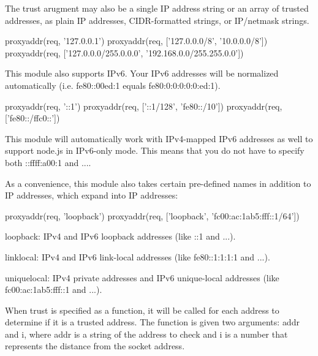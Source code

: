 The {\ttfamily trust} arugment may also be a single I\+P address string or an array of trusted addresses, as plain I\+P addresses, C\+I\+D\+R-\/formatted strings, or I\+P/netmask strings.


\begin{DoxyCode}
proxyaddr(req, \textcolor{stringliteral}{'127.0.0.1'})
proxyaddr(req, ['127.0.0.0/8', '10.0.0.0/8'])
proxyaddr(req, ['127.0.0.0/255.0.0.0', '192.168.0.0/255.255.0.0'])
\end{DoxyCode}


This module also supports I\+Pv6. Your I\+Pv6 addresses will be normalized automatically (i.\+e. {\ttfamily fe80\+:\+:00ed\+:1} equals {\ttfamily fe80\+:0\+:0\+:0\+:0\+:0\+:ed\+:1}).


\begin{DoxyCode}
proxyaddr(req, \textcolor{stringliteral}{'::1'})
proxyaddr(req, ['::1/128', 'fe80::/10'])
proxyaddr(req, ['fe80::/ffc0::'])
\end{DoxyCode}


This module will automatically work with I\+Pv4-\/mapped I\+Pv6 addresses as well to support node.\+js in I\+Pv6-\/only mode. This means that you do not have to specify both {\ttfamily \+::ffff\+:a00\+:1} and {...}.

As a convenience, this module also takes certain pre-\/defined names in addition to I\+P addresses, which expand into I\+P addresses\+:


\begin{DoxyCode}
proxyaddr(req, \textcolor{stringliteral}{'loopback'})
proxyaddr(req, ['loopback', 'fc00:ac:1ab5:fff::1/64'])
\end{DoxyCode}



\begin{DoxyItemize}
\item {\ttfamily loopback}\+: I\+Pv4 and I\+Pv6 loopback addresses (like {\ttfamily \+:\+:1} and {...}).
\item {\ttfamily linklocal}\+: I\+Pv4 and I\+Pv6 link-\/local addresses (like {\ttfamily fe80\+:\+:1\+:1\+:1\+:1} and {...}).
\item {\ttfamily uniquelocal}\+: I\+Pv4 private addresses and I\+Pv6 unique-\/local addresses (like {\ttfamily fc00\+:ac\+:1ab5\+:fff\+:\+:1} and {...}).
\end{DoxyItemize}

When {\ttfamily trust} is specified as a function, it will be called for each address to determine if it is a trusted address. The function is given two arguments\+: {\ttfamily addr} and {\ttfamily i}, where {\ttfamily addr} is a string of the address to check and {\ttfamily i} is a number that represents the distance from the socket address.

